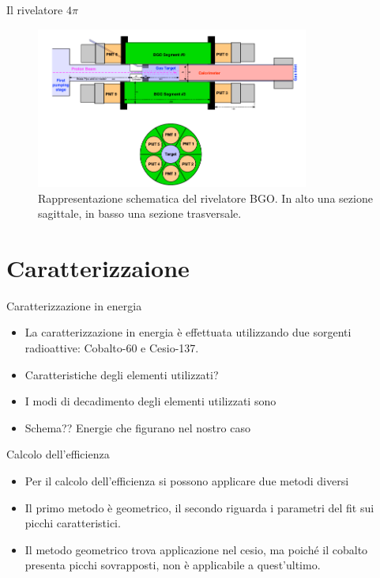 \documentclass [xcolor=svgnames] {beamer}
\begin{document}
\begin{frame}{Il rivelatore $4\pi$}
	\begin{figure}[h]
		\includegraphics[width=0.8\textwidth]{img/BGO.png}
		\caption{Rappresentazione schematica del rivelatore BGO. In alto una sezione sagittale, in basso una sezione trasversale.}
	\end{figure}
\end{frame}

\section{Caratterizzaione}
\begin{frame}{Caratterizzazione in energia}
	\begin{itemize}
		\item La caratterizzazione in energia è effettuata utilizzando due sorgenti radioattive: Cobalto-60 e Cesio-137.
		\item Caratteristiche degli elementi utilizzati?
	\end{itemize}
\end{frame}
\begin{frame}
	\begin{itemize}
		\item I modi di decadimento degli elementi utilizzati sono
		\item Schema?? Energie che figurano nel nostro caso
	\end{itemize}
\end{frame}
\begin{frame}{Calcolo dell'efficienza}
	\begin{itemize}
		\item Per il calcolo dell'efficienza si possono applicare due metodi diversi
		\item Il primo metodo è geometrico, il secondo riguarda i parametri del fit sui picchi caratteristici.
		\item Il metodo geometrico trova applicazione nel cesio, ma poiché il cobalto presenta picchi sovrapposti, non è applicabile a quest'ultimo.
	\end{itemize}
\end{frame}
	
\end{document}
